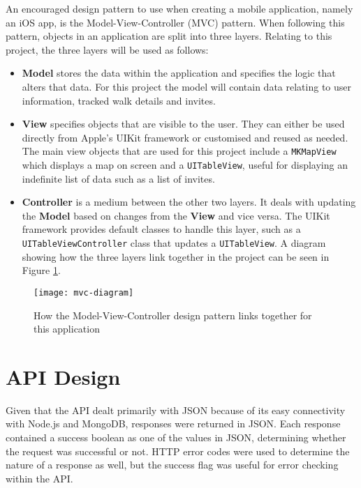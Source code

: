 An encouraged design pattern to use when creating a mobile application, namely an iOS app, is the Model-View-Controller (MVC) pattern. When following this pattern, objects in an application are split into three layers. Relating to this project, the three layers will be used as follows:

\begin{itemize}
  \item \textbf{Model} stores the data within the application and specifies the logic that alters that data. For this project the model will contain data relating to user information, tracked walk details and invites.
  
  \item \textbf{View} specifies objects that are visible to the user. They can either be used directly from Apple's UIKit framework or customised and reused as needed. The main view objects that are used for this project include a \texttt{MKMapView} which displays a map on screen and a \texttt{UITableView}, useful for displaying an indefinite list of data such as a list of invites.
  
  \item \textbf{Controller} is a medium between the other two layers. It deals with updating the \textbf{Model} based on changes from the \textbf{View} and vice versa. The UIKit framework provides default classes to handle this layer, such as a \texttt{UITableViewController} class that updates a \texttt{UITableView}. A diagram showing how the three layers link together in the project can be seen in Figure \ref{fig:mvc-diagram}.
\end{itemize}

\begin{figure}[hbt]
  \centering
  \texttt{[image: mvc-diagram]}
  \caption{How the Model-View-Controller design pattern links together for this application}
  \label{fig:mvc-diagram}
\end{figure}



\section{API Design}


Given that the API dealt primarily with JSON because of its easy connectivity with Node.js and MongoDB, responses were returned in JSON. Each response contained a success boolean as one of the values in JSON, determining whether the request was successful or not. HTTP error codes were used to determine the nature of a response as well, but the success flag was useful for error checking within the API.

